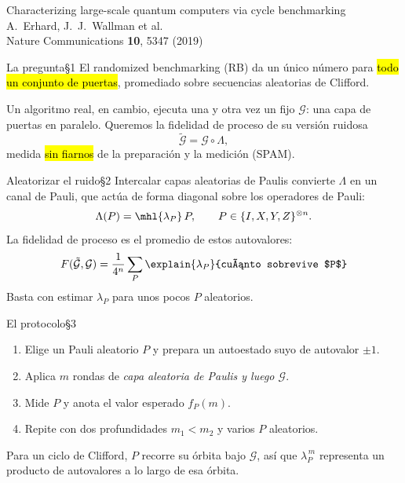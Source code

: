 \documentclass[12pt]{beamer}
\begin{document}
  {Characterizing large-scale quantum computers via cycle benchmarking}
  {A.~Erhard, J.~J.~Wallman et al.\\ Nature Communications \textbf{10}, 5347 (2019)}

\begin{frame}{La pregunta}{\S1}
El randomized benchmarking (RB) da un único número para \hl{todo un
conjunto de puertas}, promediado sobre secuencias aleatorias de Clifford.

Un algoritmo real, en cambio, ejecuta una y otra vez un  fijo
$\mathcal{G}$: una capa de puertas en paralelo. Queremos la fidelidad de
proceso de su versión ruidosa
\[
  \tilde{\mathcal{G}} = \mathcal{G}\circ\Lambda ,
\]
medida \hl{sin fiarnos} de la preparación y la medición (SPAM).
\end{frame}

\begin{frame}{Aleatorizar el ruido}{\S2}
Intercalar capas aleatorias de Paulis convierte $\Lambda$ en un canal de
Pauli, que actúa de forma diagonal sobre los operadores de Pauli:
\begin{equation}
  \Lambda(P) = \mhl{\lambda_P}\, P , \qquad P \in \{I,X,Y,Z\}^{\otimes n}.
\end{equation}
La fidelidad de proceso es el promedio de estos autovalores:
\begin{equation}
  F(\tilde{\mathcal{G}},\mathcal{G})
  = \frac{1}{4^n}\sum_{P}\explain{\lambda_P}{cuánto sobrevive $P$}
\end{equation}
Basta con estimar $\lambda_P$ para unos pocos $P$ aleatorios.
\end{frame}

\begin{frame}{El protocolo}{\S3}
\begin{enumerate}
  \item Elige un Pauli aleatorio $P$ y prepara un autoestado suyo de
        autovalor $\pm1$.
  \item Aplica $m$ rondas de \emph{capa aleatoria de Paulis y luego
        $\mathcal{G}$}.
  \item Mide $P$ y anota el valor esperado $f_P(m)$.
  \item Repite con dos profundidades $m_1 < m_2$ y varios $P$ aleatorios.
\end{enumerate}
\begin{notebox}[Esquema]
Para un ciclo de Clifford, $P$ recorre su órbita bajo $\mathcal{G}$, así
que $\lambda_P^{\,m}$ representa un producto de autovalores a lo largo de
esa órbita.
\end{notebox}
\end{frame}
\end{document}
